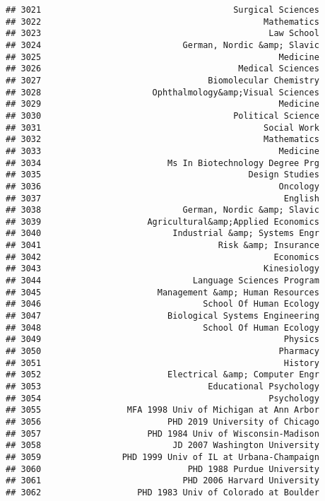 \documentclass[
]{article}
\begin{document}
\begin{verbatim}
## 3021                                      Surgical Sciences
## 3022                                            Mathematics
## 3023                                             Law School
## 3024                            German, Nordic &amp; Slavic
## 3025                                               Medicine
## 3026                                       Medical Sciences
## 3027                                 Biomolecular Chemistry
## 3028                      Ophthalmology&amp;Visual Sciences
## 3029                                               Medicine
## 3030                                      Political Science
## 3031                                            Social Work
## 3032                                            Mathematics
## 3033                                               Medicine
## 3034                         Ms In Biotechnology Degree Prg
## 3035                                         Design Studies
## 3036                                               Oncology
## 3037                                                English
## 3038                            German, Nordic &amp; Slavic
## 3039                     Agricultural&amp;Applied Economics
## 3040                          Industrial &amp; Systems Engr
## 3041                                   Risk &amp; Insurance
## 3042                                              Economics
## 3043                                            Kinesiology
## 3044                              Language Sciences Program
## 3045                       Management &amp; Human Resources
## 3046                                School Of Human Ecology
## 3047                         Biological Systems Engineering
## 3048                                School Of Human Ecology
## 3049                                                Physics
## 3050                                               Pharmacy
## 3051                                                History
## 3052                         Electrical &amp; Computer Engr
## 3053                                 Educational Psychology
## 3054                                             Psychology
## 3055                 MFA 1998 Univ of Michigan at Ann Arbor
## 3056                         PHD 2019 University of Chicago
## 3057                     PHD 1984 Univ of Wisconsin-Madison
## 3058                          JD 2007 Washington University
## 3059                PHD 1999 Univ of IL at Urbana-Champaign
## 3060                             PHD 1988 Purdue University
## 3061                            PHD 2006 Harvard University
## 3062                   PHD 1983 Univ of Colorado at Boulder

\end{verbatim}
\end{document}
